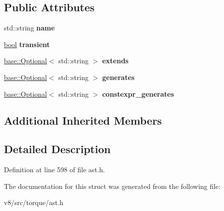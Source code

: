 \subsection*{Public Attributes}
\begin{DoxyCompactItemize}
\item 
\mbox{\label{structv8_1_1internal_1_1torque_1_1TypeDeclaration_a6f55293269c895e37a286fc9588d5a5b}} 
std\+::string {\bfseries name}
\item 
\mbox{\label{structv8_1_1internal_1_1torque_1_1TypeDeclaration_a1e5fcfb0ffef1e43312f6e9c8b0b227f}} 
\mbox{\hyperlink{classbool}{bool}} {\bfseries transient}
\item 
\mbox{\label{structv8_1_1internal_1_1torque_1_1TypeDeclaration_a13cd7ce1c6beff0046fa6866b9cce211}} 
\mbox{\hyperlink{classv8_1_1base_1_1Optional}{base\+::\+Optional}}$<$ std\+::string $>$ {\bfseries extends}
\item 
\mbox{\label{structv8_1_1internal_1_1torque_1_1TypeDeclaration_a6bb1e0a27b6dfa63ec617564cea5d9ef}} 
\mbox{\hyperlink{classv8_1_1base_1_1Optional}{base\+::\+Optional}}$<$ std\+::string $>$ {\bfseries generates}
\item 
\mbox{\label{structv8_1_1internal_1_1torque_1_1TypeDeclaration_ada93c14a623d53bdb677f98940f7081e}} 
\mbox{\hyperlink{classv8_1_1base_1_1Optional}{base\+::\+Optional}}$<$ std\+::string $>$ {\bfseries constexpr\+\_\+generates}
\end{DoxyCompactItemize}
\subsection*{Additional Inherited Members}


\subsection{Detailed Description}


Definition at line 598 of file ast.\+h.



The documentation for this struct was generated from the following file\+:\begin{DoxyCompactItemize}
\item 
v8/src/torque/ast.\+h\end{DoxyCompactItemize}

